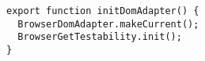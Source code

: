 \begin{verbatim}
export function initDomAdapter() {
  BrowserDomAdapter.makeCurrent();
  BrowserGetTestability.init();
}
\end{verbatim}
